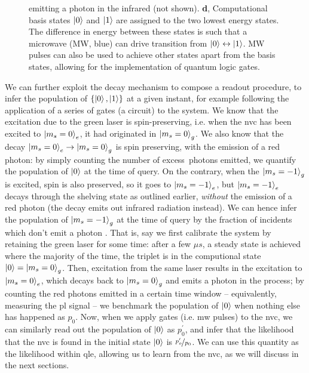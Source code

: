 \begin{figure}[t]
{            emitting a photon in the infrared (not shown).
        \textbf{d}, Computational basis states $\ket{0}$ and $\ket{1}$ are assigned to the two lowest energy states.
            The difference in energy between these states is such that a microwave (MW, blue) 
                can drive transition from $\ket{0} \leftrightarrow \ket{1}$.
            MW pulses can also be used to achieve other states apart from the basis states,
                allowing for the implementation of quantum logic gates. 
    }
    \label{fig:nv_centre_energy_levels}
\end{figure}


We can further exploit the decay mechanism to compose a readout procedure, 
    to infer the population of $\{\ket{0}, \ket{1}\}$ at a given instant, 
    for example following the application of a series of gates (a circuit) to the system. 
We know that the excitation due to the green laser is spin-preserving, 
    i.e. when the \gls{nvc} has been excited to $\ket{m_s=0}_e$, 
    it had originated in $\ket{m_s=0}_g$.
We also know that the decay $\ket{m_s=0}_e \rightarrow \ket{m_s=0}_g$ is spin preserving, with the emission of 
    a red photon: by simply counting the number of excess\footnotemark \ photons emitted, 
    we quantify the population of $\ket{0}$ at the time of query. 
On the contrary, when the $\ket{m_s=-1}_g$ is excited, 
    spin is also preserved, so it goes to $\ket{m_s=-1}_e$, 
    but $\ket{m_s=-1}_e$ decays through the shelving state as outlined earlier, 
    \emph{without} the emission of a red photon (the decay emits out infrared radiation instead). 
We can hence infer the population of $\ket{m_s=-1}_g$ at the time of query by the fraction of incidents which don't 
    emit a photon \cite{knauer2016photonic}.
That is, say we first calibrate the system by retaining the green laser for some time: 
    after a few $\mu s$, a steady state is achieved where the majority of the time, the triplet is in the computional state $\ket{0} = \ket{m_s=0}_g$. 
Then, excitation from the same laser results in the excitation to $\ket{m_s=0}_e$, 
    which decays back to $\ket{m_s=0}_g$ and emits a photon in the process; 
    by counting the red photons emitted in a certain time window -- equivalently, measuring the \gls{pl} signal -- 
    we benchmark the population of $\ket{0}$ when nothing else has happened as $p_0$. 
Now, when we apply gates (i.e. \gls{mw} pulses) to the \gls{nvc}, 
    we can similarly read out the population of $\ket{0}$ as $p_0^{\prime}$,
    and infer that the likelihood that the \gls{nvc} is found in the initial state $\ket{0}$ is $\nicefrac{p_o^{\prime}}{p_0}$. 
We can use this quantity as the  \gls{likelihood} within \gls{qle}, allowing us to learn from the \gls{nvc},
    as we will discuss in the next sections. 

